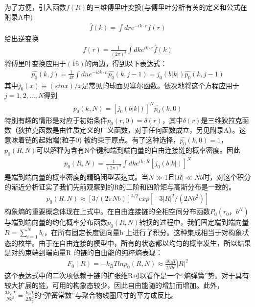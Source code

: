 为了方便，引入函数$f(R)$的三维傅里叶变换(与傅里叶分析有关的定义和公式在附录A中)\\
\begin{gather}
\hat{f}(k)=\int dre^{-ik \cdot r}f(r)
\end{gather}
给出逆变换\\
\begin{gather}
 f(r)=\frac{1}{(2 \pi)^3} \int dke^{ik \cdot r} \hat{f}(k)
\end{gather}
将傅里叶变换应用于$(15)$的两边，得到以下表达式：\\
\begin{gather}
\hat{p_0}(k,j)=\frac{1}{4 \pi} \int dne^{-ibk \cdot n} \hat{p_0}(k,j-1)=j_0(b|k|)\hat{p_0}(k,j-1)
\end{gather}
其中$j_0(x) \equiv (sinx)/x$是常见的球面贝塞尔函数。依次地将这个方程应用于$j=1,2,\ldots,N$得到\\
\begin{gather}
\hat{p_0}(k,N)=[j_0(b|k|)]^{N}\hat{p_0}(k,0)
\end{gather}
特别有趣的情形是对应于初始条件$p_0(r,0)=\delta(r)$，其中$\delta(r)$是三维狄拉克函数（狄拉克函数是由性质定义的广义函数，对于任何函数成立，另见附录A）。这意味着链的起始端(粒子$0$) 被约束于原点。有了这种选择，$\hat{p_0}(k,0)=1$，$p_0(R,N)$可以解释为含有N个键和端到端向量的自由连接链的概率密度。因此\\
\begin{gather}
p_0(R,N)=\frac{1}{(2 \pi)^3 }\int dke^{ik \cdot R}[j_0(b|k|)]^{N}
\end{gather}
是端到端向量的概率密度的精确闭型表达式。当$N\gg1$且$|R| \ll Nb $时，对这个积分的渐近分析证实了我们先前观察到的R的二阶和四阶矩与高斯分布是一致的。\\
\begin{gather}
p_0(R,N) \approx [3/(2 \pi Nb)]^{3/2}exp[-3|R|^2/(2Nb^2)]
\end{gather}
构象熵的重要概念体现在上式中。在自由连接链的全相空间分布函数$P_0(r_0，b^{N})$与端到端向量的约化概率分布函数$p_0(R,N)$转换的过程中，我们固定端到端向量$R=\sum _{i=1}^{N} b_{i}$，在所有固定长度键向量b 上进行了积分。这种集成相当于对构象状态的枚举。由于在自由连接的模型中，所有的状态都以均匀的概率发生，所以结果是对约束端到端向量R 的链的自由能的纯粹熵表现：\\
\begin{gather}
F_0(R)=-k_{B}Tlnp_0(R,N)\approx \frac{3k_{B}T}{2Nb^2}|R|^2
\end{gather}
这个表达式中的二次项依赖于链的扩张维R可以看作是一个“熵弹簧”势。对于具有较大扩展的链，可用的构象态较少，因此自由能随的增加而增加。此外，$\frac{3k_{B}T}{Nb^2}=\frac{k_{B}T}{2R^2_{g}}$的“弹簧常数”与聚合物线圈尺寸的平方成反比。\\


